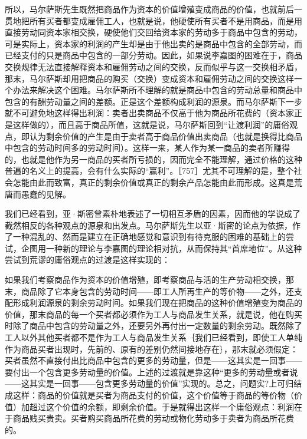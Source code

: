 所以，马尔萨斯先生既然把商品作为资本的价值增殖变成商品的价值，也就前后一贯地把所有买者都变成雇佣工人，也就是说，他硬使所有买者不是用商品，而是用直接劳动同资本家相交换，硬使他们交回给资本家的劳动多于商品中包含的劳动，可是实际上，资本家的利润的产生却是由于他出卖的是商品中包含的全部劳动，而已经支付的只是商品中包含的一部分劳动。因此，如果说李嘉图的困难在于，商品交换规律无法直接解释资本和雇佣劳动之间的交换，反而似乎与这一交换相矛盾，那末，马尔萨斯却用把商品的购买（交换）变成资本和雇佣劳动之间的交换这样一个办法来解决这个困难。马尔萨斯所不理解的就是商品中包含的劳动总量和商品中包含的有酬劳动量之间的差额。正是这个差额构成利润的源泉。而马尔萨斯下一步就不可避免地这样得出利润：卖者出卖商品不仅高于他为商品所花费的（资本家正是这样做的），而且高于商品所值，这就是说，马尔萨斯回到“让渡利润”的庸俗观点，即认为剩余价值的产生是由于卖者高于商品价值出卖商品（也就是换得比商品中包含的劳动时间多的劳动时间）。这样一来，某人作为某一商品的卖者所赚得的，也就是他作为另一商品的买者所亏损的，因而完全不能理解，通过价格的这种普遍的名义上的提高，会有什么实际的“赢利”。［757］尤其不可理解的是，整个社会怎能由此而致富，真正的剩余价值或真正的剩余产品怎能由此而形成。这真是荒唐而愚蠢的见解。

我们已经看到，亚·斯密曾素朴地表述了一切相互矛盾的因素，因而他的学说成了截然相反的各种观点的源泉和出发点。马尔萨斯先生以亚·斯密的论点为依据，作了一种混乱的、然而是建立在正确地感觉和意识到有待克服的困难的基础上的尝试，企图用一种新的理论与李嘉图的理论相对抗，从而保持其“首席地位”。从这种尝试到荒谬的庸俗观点的过渡是这样实现的：

如果我们考察商品作为资本的价值增殖，即考察商品与活的生产劳动相交换，那末，商品除了它本身包含的劳动时间——即工人所再生产的等价物——之外，还支配形成利润源泉的剩余劳动时间。如果我们现在把商品的这种价值增殖变为商品的价值，那末商品的每一个买者都必须作为工人与商品发生关系，就是说，他在购买时除了商品中包含的劳动量之外，还要另外再付出一定数量的剩余劳动。既然除了工人以外其他买者都不是作为工人与商品发生关系｛我们已经看到，即使工人单纯作为商品买者出现时，先前的、原有的差别仍然间接地存在｝，那末就必须假定：买者虽然不直接付出比商品中包含的更多的劳动量，但是——这其实是一回事——要付出一个包含更多劳动量的价值。上述的过渡就是靠这种“更多的劳动量或者说——这其实是一回事——包含更多劳动量的价值”实现的。总之，问题实?上可归结成这样：商品的价值就是买者为商品支付的价值，这个价值等于商品的等价物（价值）加超过这个价值的余额，即剩余价值。于是就得出这样一个庸俗观点：利润在于商品贱买贵卖。买者购买商品所花费的劳动或物化劳动多于卖者为商品所花费的。

